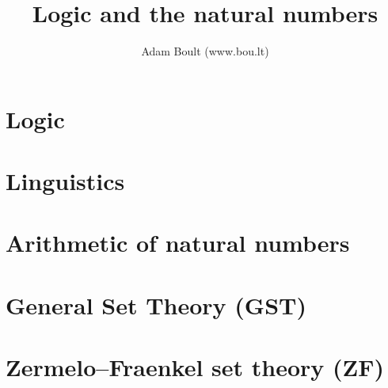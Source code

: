 \documentclass[oneside]{book}
\begin{document}
\author{Adam Boult (www.bou.lt)}
\title{Logic and the natural numbers}
\maketitle

\setcounter{tocdepth}{0}
\tableofcontents



\part{Logic}






\part{Linguistics}


\part{Arithmetic of natural numbers}













\part{General Set Theory (GST)}






\part{Zermelo–Fraenkel set theory (ZF)}




\end{document}
